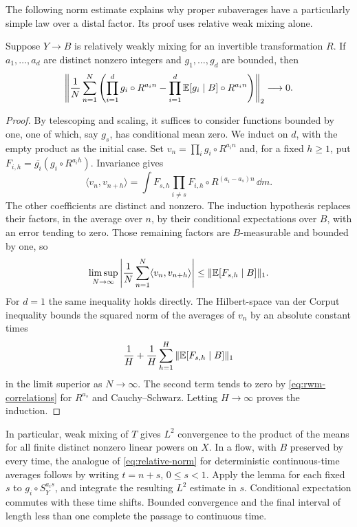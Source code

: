 The following norm estimate explains why proper subaverages have a
particularly simple law over a distal factor.  Its proof uses relative
weak mixing alone.

\begin{lemma}
\label{lem:relative-norm}
Suppose $Y\to B$ is relatively weakly mixing for an invertible
transformation $R$.  If $a_1,\ldots,a_d$ are distinct nonzero integers
and $g_1,\ldots,g_d$ are bounded, then
\begin{equation}\label{eq:relative-norm}
 \left\|\frac1N\sum_{n=1}^N
 \left(\prod_{i=1}^d g_i\circ R^{a_i n}
 -\prod_{i=1}^d\mathbb E[g_i\mid B]\circ R^{a_i n}\right)\right\|_2
 \longrightarrow0.
\end{equation}
\end{lemma}

\begin{proof}
By telescoping and scaling, it suffices to consider functions bounded
by one, one of which, say $g_s$, has conditional mean zero.  We induct
on $d$, with the empty product as the initial case.  Set
$v_n=\prod_i g_i\circ R^{a_i n}$ and, for a fixed $h\ge1$, put
$F_{i,h}=\overline{g_i}(g_i\circ R^{a_i h})$.
Invariance gives
\[
 \langle v_n,v_{n+h}\rangle
 =\int F_{s,h}\prod_{i\ne s}
       F_{i,h}\circ R^{(a_i-a_s)n}\,\dd m.
\]
The other coefficients are distinct and nonzero.  The induction
hypothesis replaces their factors, in the average over $n$, by
their conditional expectations over $B$, with an error tending to
zero.  Those remaining factors are $B$-measurable and bounded by
one, so
\[
 \limsup_{N\to\infty}
 \left|\frac1N\sum_{n=1}^N\langle v_n,v_{n+h}\rangle\right|
 \le \|\mathbb E[F_{s,h}\mid B]\|_1.
\]
For $d=1$ the same inequality holds directly.  The Hilbert-space
van der Corput inequality bounds the squared norm of the averages
of $v_n$ by an absolute constant times
\[
 \frac1H+\frac1H\sum_{h=1}^H\|\mathbb E[F_{s,h}\mid B]\|_1
\]
in the limit superior as $N\to\infty$.  The second term tends to
zero by \eqref{eq:rwm-correlations} for $R^{a_s}$ and
Cauchy--Schwarz.  Letting $H\to\infty$ proves the induction.
\end{proof}

In particular, weak mixing of $T$ gives $L^2$ convergence to the
product of the means for all finite distinct nonzero linear powers
on $X$.  In a flow, with $B$ preserved by every time, the analogue of
\eqref{eq:relative-norm} for deterministic continuous-time averages
follows by writing $t=n+s$, $0\le s<1$.  Apply the lemma for each
fixed $s$ to $g_i\circ S_Y^{a_i s}$, and integrate the resulting
$L^2$ estimate in $s$.  Conditional expectation commutes with these
time shifts.  Bounded convergence and the final interval of length
less than one complete the passage to continuous time.
